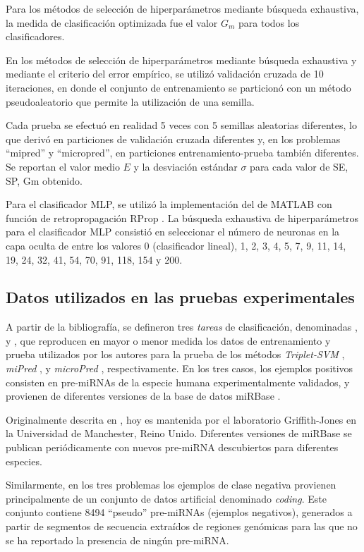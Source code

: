 \documentclass[12pt,bibliography=oldstyle,DIV=12,parskip=half-]{scrreprt}
\newcommand{\e}{\emph}
\begin{document}
Para los métodos de selección de hiperparámetros mediante búsqueda
exhaustiva, la medida de clasificación optimizada fue el valor $G_m$
para todos los clasificadores.

En los métodos de selección de hiperparámetros mediante búsqueda
exhaustiva y mediante el criterio del error empírico, se utilizó
validación cruzada de 10 iteraciones, en donde el conjunto de
entrenamiento se particionó con un método pseudoaleatorio que permite
la utilización de una semilla.

Cada prueba se efectuó en realidad 5 veces con 5 semillas aleatorias
diferentes, lo que derivó en particiones de validación cruzada
diferentes y, en los problemas ``mipred'' y ``micropred'', en
particiones entrenamiento-prueba también diferentes.  Se reportan el
valor medio $E$ y la desviación estándar $\sigma$ para cada valor de
SE, SP, Gm obtenido.

Para el clasificador MLP, se utilizó la implementación del  de MATLAB con función de retropropagación RProp
\cite{rprop}.  La búsqueda exhaustiva de hiperparámetros para el
clasificador MLP consistió en seleccionar el número de neuronas en la
capa oculta de entre los valores 0 (clasificador lineal), 1, 2, 3, 4,
5, 7, 9, 11, 14, 19, 24, 32, 41, 54, 70, 91, 118, 154 y 200.
%
%
\subsection{Datos utilizados en las pruebas experimentales}
%
A partir de la bibliografía, se defineron tres \e{tareas} de
clasificación, denominadas ,  y
, que reproducen en mayor o menor medida los datos de
entrenamiento y prueba utilizados por los autores para la prueba de
los métodos \e{Triplet-SVM} \cite{xue}, \e{miPred} \cite{ng}, y
\e{microPred} \cite{batuwita}, respectivamente.
%
En los tres casos, los ejemplos positivos consisten en pre-miRNAs de
la especie humana experimentalmente validados, y provienen de
diferentes versiones de la base de datos miRBase \cite{mirbase1,
  mirbase2, mirbase3}.

Originalmente descrita en \cite{mirbase3}, hoy es mantenida por el
laboratorio Griffith-Jones en la Universidad de Manchester, Reino
Unido. Diferentes versiones de miRBase se publican periódicamente con
nuevos pre-miRNA descubiertos para diferentes especies.

Similarmente, en los tres problemas los ejemplos de clase negativa
provienen principalmente de un conjunto de datos artificial
denominado \e{coding}. Este conjunto contiene 8494 ``pseudo''
pre-miRNAs (ejemplos negativos), generados a partir de segmentos de
secuencia extraídos de regiones genómicas para las que no se ha
reportado la presencia de ningún pre-miRNA.
\end{document}
